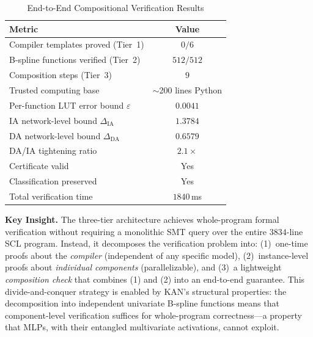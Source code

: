 \begin{table}[ht]
\centering
\caption{End-to-End Compositional Verification Results}
\label{tab:compositional}
\begin{tabular}{@{}lc@{}}
\toprule
\textbf{Metric} & \textbf{Value} \\
\midrule
  Compiler templates proved (Tier~1) & $0/6$ \\
  B-spline functions verified (Tier~2) & $512/512$ \\
  Composition steps (Tier~3) & $9$ \\
  Trusted computing base & $\sim$200 lines Python \\
\midrule
  Per-function LUT error bound $\varepsilon$ & $0.0041$ \\
  IA network-level bound $\Delta_{\text{IA}}$ & $1.3784$ \\
  DA network-level bound $\Delta_{\text{DA}}$ & $0.6579$ \\
  DA/IA tightening ratio & $2.1\times$ \\
\midrule
  Certificate valid & Yes \\
  Classification preserved & Yes \\
  Total verification time & $1840$\,ms \\
\bottomrule
\end{tabular}
\end{table}

\textbf{Key Insight.} The three-tier architecture
achieves whole-program formal verification without
requiring a monolithic SMT query over the entire
$3834$-line SCL program. Instead, it decomposes
the verification problem into:
(1)~one-time proofs about the \textit{compiler}
(independent of any specific model),
(2)~instance-level proofs about
\textit{individual components} (parallelizable), and
(3)~a lightweight \textit{composition check} that
combines (1) and (2) into an end-to-end guarantee.
This divide-and-conquer strategy is enabled by KAN's
structural properties: the decomposition into
independent univariate B-spline functions means
that component-level verification suffices for
whole-program correctness---a property that MLPs,
with their entangled multivariate activations,
cannot exploit.
